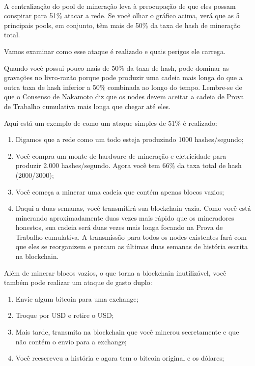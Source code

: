 \paragraph{}

A centralização do pool de mineração leva à preocupação de que eles possam conspirar para 51\% atacar a rede. Se você olhar o gráfico acima, verá que as 5 principais pools, em conjunto, têm mais de 50\% da taxa de hash de mineração total.

Vamos examinar como esse ataque é realizado e quais perigos ele carrega.

Quando você possui pouco mais de 50\% da taxa de hash, pode dominar as gravações no livro-razão porque pode produzir uma cadeia mais longa do que a outra taxa de hash inferior a 50\% combinada ao longo do tempo. Lembre-se de que o Consenso de Nakamoto diz que os nodes devem aceitar a cadeia de Prova de Trabalho cumulativa mais longa que chegar até eles.

Aqui está um exemplo de como um ataque simples de 51\% é realizado:

\begin{enumerate}
\item Digamos que a rede como um todo esteja produzindo 1000 hashes/segundo;
\item Você compra um monte de hardware de mineração e eletricidade para produzir 2.000 hashes/segundo. Agora você tem 66\% da taxa total de hash (2000/3000);
\item Você começa a minerar uma cadeia que contém apenas blocos vazios;
\item Daqui a duas semanas, você transmitirá sua blockchain vazia. Como você está minerando aproximadamente duas vezes mais rápido que os mineradores honestos, sua cadeia será duas vezes mais longa focando na Prova de Trabalho cumulativa. A transmissão para todos os nodes existentes fará com que eles se reorganizem e percam as últimas duas semanas de história escrita na blockchain.
\end{enumerate}

Além de minerar blocos vazios, o que torna a blockchain inutilizável, você também pode realizar um ataque de gasto duplo:

\begin{enumerate}
\item Envie algum bitcoin para uma exchange;
\item Troque por USD e retire o USD;
\item Mais tarde, transmita na blockchain que você minerou secretamente e que não contém o envio para a exchange;
\item Você reescreveu a história e agora tem o bitcoin original e os dólares;
\end{enumerate}

